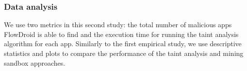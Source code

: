 \subsubsection{Data analysis}


We use two metrics in this second study:
the total number of malicious apps FlowDroid is able to
find and the execution time for running the taint analysis algorithm
for each app. Similarly to the first empirical study,
we use descriptive statistics
and plots to compare the performance of the taint analysis and
mining sandbox approaches. 










